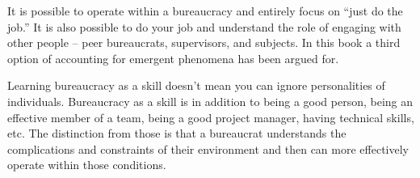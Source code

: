 It is possible to operate within a bureaucracy and entirely focus on ``just do the job.'' It is also possible to do your job and understand the role of engaging with other people -- peer bureaucrats, supervisors, and subjects. In this book a third option of accounting for emergent phenomena has been argued for. 

Learning bureaucracy as a skill doesn't mean you can ignore personalities of individuals. Bureaucracy as a skill is in addition to being a good person, being an effective member of a team, being a good project manager, having technical skills, etc. The distinction from those is that a bureaucrat understands the complications and constraints of their environment and then can more effectively operate within those conditions.

